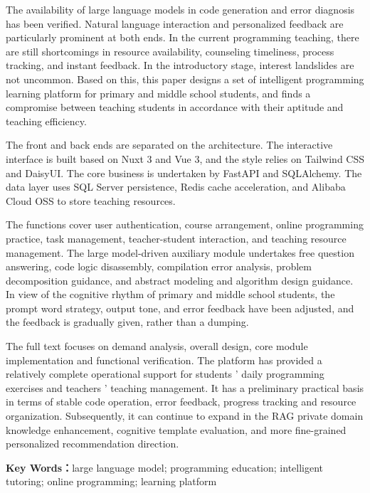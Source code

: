 {\setlength{\baselineskip}{20pt}
The availability of large language models in code generation and error diagnosis has been verified. Natural language interaction and personalized feedback are particularly prominent at both ends. In the current programming teaching, there are still shortcomings in resource availability, counseling timeliness, process tracking, and instant feedback. In the introductory stage, interest landslides are not uncommon. Based on this, this paper designs a set of intelligent programming learning platform for primary and middle school students, and finds a compromise between teaching students in accordance with their aptitude and teaching efficiency. 
 
The front and back ends are separated on the architecture. The interactive interface is built based on Nuxt 3 and Vue 3, and the style relies on Tailwind CSS and DaisyUI. The core business is undertaken by FastAPI and SQLAlchemy. The data layer uses SQL Server persistence, Redis cache acceleration, and Alibaba Cloud OSS to store teaching resources. 
 
The functions cover user authentication, course arrangement, online programming practice, task management, teacher-student interaction, and teaching resource management. The large model-driven auxiliary module undertakes free question answering, code logic disassembly, compilation error analysis, problem decomposition guidance, and abstract modeling and algorithm design guidance. In view of the cognitive rhythm of primary and middle school students, the prompt word strategy, output tone, and error feedback have been adjusted, and the feedback is gradually given, rather than a dumping. 
 
The full text focuses on demand analysis, overall design, core module implementation and functional verification. The platform has provided a relatively complete operational support for students ' daily programming exercises and teachers ' teaching management. It has a preliminary practical basis in terms of stable code operation, error feedback, progress tracking and resource organization. Subsequently, it can continue to expand in the RAG private domain knowledge enhancement, cognitive template evaluation, and more fine-grained personalized recommendation direction.

\vspace{20pt}
\noindent{}\textbf{Key Words：}large language model; programming education; intelligent tutoring; online programming; learning platform
}
